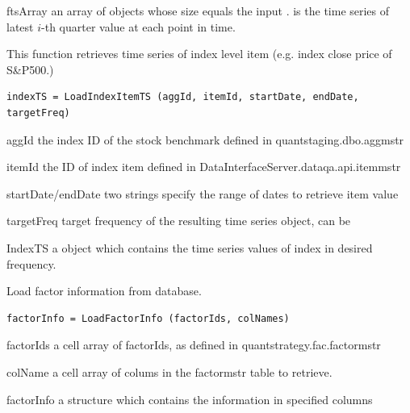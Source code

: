 \outarg 
   \begin{argdesc}
   \item[ftsArray] an array of \myfints{} objects whose size equals the input . 
           is the time series of latest $i$-th quarter value at each point in time.
   \end{argdesc}

     This function retrieves time series of index level item (e.g. index close price of S\&P500.) 

\usage
   \begin{lstlisting}[numbers=none]
   indexTS = LoadIndexItemTS (aggId, itemId, startDate, endDate, targetFreq)
   \end{lstlisting}

\inarg
   \begin{argdesc}
	\item[aggId] the index ID of the stock benchmark defined in quantstaging.dbo.aggmstr 
	\item[itemId] the ID of index item defined in DataInterfaceServer.dataqa.api.itemmstr  
	\item[startDate/endDate] two strings specify the range of dates to retrieve item value
	\item[targetFreq] target frequency of the resulting time series object, can be
        
   \end{argdesc}

\outarg
  \begin{argdesc}
	 \item[IndexTS] a \myfints{} object which contains the time series values of index in desired frequency.
  \end{argdesc}

   Load factor information from database.

\usage
   \begin{lstlisting}[numbers=none]
   factorInfo = LoadFactorInfo (factorIds, colNames)
   \end{lstlisting}

\inarg
	\begin{argdesc}
	\item[factorIds] a cell array of factorIds, as defined in quantstrategy.fac.factormstr
	\item[colName] a cell array of colums in the factormstr table to retrieve.
	\end{argdesc}

\outarg
   \begin{argdesc}
	\item[factorInfo]  a structure which contains the information in specified columns
   \end{argdesc}

